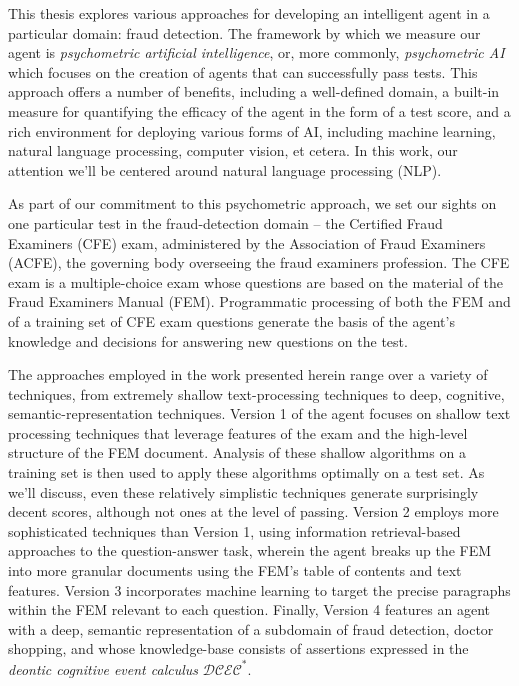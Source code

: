  
 
This thesis explores various approaches for developing an intelligent agent in a particular domain: fraud detection.  The framework by which we measure our agent is \textit{psychometric artificial intelligence}, or, more commonly, \textit{psychometric AI} which focuses on the creation of agents that can successfully pass tests.  This approach offers a number of benefits, including a well-defined domain, a built-in measure for quantifying the efficacy of the agent in the form of a test score, and a rich environment for deploying various forms of AI, including machine learning, natural language processing, computer vision, et cetera.  In this work, our attention we'll be centered around natural language processing (NLP).

As part of our commitment to this psychometric approach, we set our sights on one particular test in the fraud-detection domain -- the Certified Fraud Examiners (CFE) exam, administered by the Association of Fraud Examiners (ACFE), the governing body overseeing the fraud examiners profession.  The CFE exam is a multiple-choice exam whose questions are based on the material of the Fraud Examiners Manual (FEM).  Programmatic processing of both the FEM and of a training set of CFE exam questions generate the basis of the agent's knowledge and decisions for answering new questions on the test.

The approaches employed in the work presented herein range over a variety of techniques, from 
extremely shallow text-processing techniques to deep, cognitive, semantic-representation techniques.  Version 1 of the agent focuses on shallow text processing techniques that leverage features of the exam and the high-level structure of the FEM document.  Analysis of these shallow algorithms on a training set is then used to apply these algorithms optimally on a test set.  As we'll discuss, even these relatively simplistic techniques generate surprisingly decent scores, although not ones at the level of passing.  Version 2 employs more sophisticated techniques than Version 1, using information retrieval-based approaches to the question-answer task, wherein the agent breaks up the FEM into more granular documents using the FEM's table of contents and text features.  Version 3 incorporates machine learning to target the precise paragraphs within the FEM relevant to each question.  Finally, Version 4 features an agent with a deep, semantic representation of a subdomain of fraud detection, doctor shopping, and whose knowledge-base consists of assertions expressed in the \textit{deontic cognitive event calculus} $\mathcal{DCEC}^\ast$.

